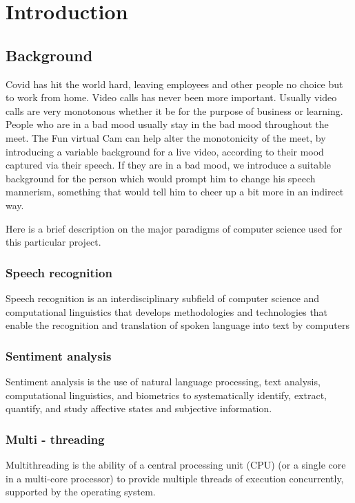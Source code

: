 \chapter{Introduction} 
\label{Chapter1} 

\section{Background}
Covid has hit the world hard, leaving employees and other people no choice but to work from home. Video calls has never been more important. Usually video calls are very monotonous whether it be for the purpose of business or learning. People who are in a bad mood usually stay in the bad mood throughout the meet. The Fun virtual Cam can help alter the monotonicity of the meet, by introducing a variable background for a live video, according to their mood captured via their speech. If they are in a bad mood, we introduce a suitable background for the person which would prompt him to change his speech mannerism, something that would tell him to cheer up a bit more in an indirect way.

Here is a brief description on the major paradigms of computer science used for this particular project.

\subsection{Speech recognition}
Speech recognition is an interdisciplinary subfield of computer science and computational linguistics that develops methodologies and technologies that enable the recognition and translation of spoken language into text by computers\cite{SpeechRecognitionDef}
\subsection{Sentiment analysis}
Sentiment analysis is the use of natural language processing, text analysis, computational linguistics, and biometrics to systematically identify, extract, quantify, and study affective states and subjective information.\cite{SentimentAnalysisDef}
\subsection{Multi - threading}
Multithreading is the ability of a central processing unit (CPU) (or a single core in a multi-core processor) to provide multiple threads of execution concurrently, supported by the operating system.\cite{MultiThreadingDef}

